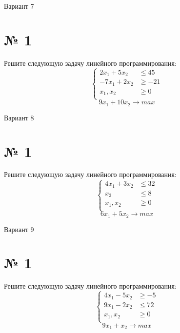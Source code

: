 \documentclass{article}%
\begin{document}
%
\newpage%
\begin{center}%
\begin{Huge}%
Вариант 7%
\end{Huge}%
\end{center}%
\section*{№ 1}%
\label{sec:1}%
Решите следующую задачу линейного программирования: %
\[%
\left\{\begin{aligned}2x_{1}+5x_{2} & \le45 \\-7x_{1}+2x_{2} & \ge-21 \\x_{1},x_{2} & \ge 0 \\\end{aligned}\right.%
\]%
\[%
9x_{1}+10x_{2}  \to max%
\]

%
\newpage%
\begin{center}%
\begin{Huge}%
Вариант 8%
\end{Huge}%
\end{center}%
\section*{№ 1}%
\label{sec:1}%
Решите следующую задачу линейного программирования: %
\[%
\left\{\begin{aligned}4x_{1}+3x_{2} & \le32 \\x_{2} & \le8 \\x_{1},x_{2} & \ge 0 \\\end{aligned}\right.%
\]%
\[%
6x_{1}+5x_{2}  \to max%
\]

%
\newpage%
\begin{center}%
\begin{Huge}%
Вариант 9%
\end{Huge}%
\end{center}%
\section*{№ 1}%
\label{sec:1}%
Решите следующую задачу линейного программирования: %
\[%
\left\{\begin{aligned}4x_{1}-5x_{2} & \ge-5 \\9x_{1}-2x_{2} & \le72 \\x_{1},x_{2} & \ge 0 \\\end{aligned}\right.%
\]%
\[%
9x_{1}+x_{2}  \to max%
\]
\end{document}
